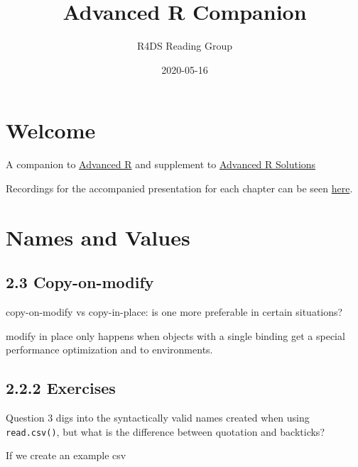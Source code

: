 \documentclass[]{book}
\title{Advanced R Companion}
\author{R4DS Reading Group}
\date{2020-05-16}
\begin{document}
\maketitle

{
\setcounter{tocdepth}{1}
\tableofcontents
}
\hypertarget{welcome}{%
\chapter{Welcome}\label{welcome}}

A companion to \href{https://adv-r.hadley.nz/rcpp.html\#acknowledgments}{Advanced R} and supplement to \href{https://advanced-r-solutions.rbind.io/names-and-values.html\#copy-on-modify}{Advanced R Solutions}

Recordings for the accompanied presentation for each chapter can be seen \href{https://www.youtube.com/watch?v=pQ-xDAPEQaw\&list=PL3x6DOfs2NGi9lH7q-phZlPrl6HKXYDbn}{here}.

\hypertarget{names-and-values}{%
\chapter{Names and Values}\label{names-and-values}}

\hypertarget{copy-on-modify}{%
\section*{2.3 Copy-on-modify}\label{copy-on-modify}}

copy-on-modify vs copy-in-place: is one more preferable in certain situations?

modify in place only happens when objects with a single binding get a special performance optimization and to environments.

\hypertarget{exercises}{%
\section*{2.2.2 Exercises}\label{exercises}}

Question 3 digs into the syntactically valid names created when using \texttt{read.csv()}, but what is the difference between quotation and backticks?

If we create an example csv
\end{document}
